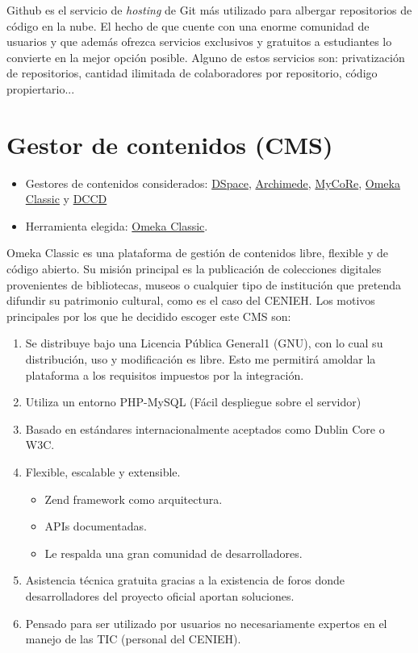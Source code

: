 Github es el servicio de \emph{hosting} de Git más utilizado para albergar repositorios de código en la nube. El hecho de que cuente con una enorme comunidad de usuarios y que además ofrezca servicios exclusivos y gratuitos a estudiantes lo convierte en la mejor opción posible. Alguno de estos servicios son: privatización de repositorios, cantidad ilimitada de colaboradores por repositorio, código propiertario... 

\section{Gestor de contenidos (CMS)}\label{cms}

\begin{itemize}
\tightlist
	\item Gestores de contenidos considerados:
  		\href{https://duraspace.org/dspace/}{DSpace},
  		\href{https://www.bibl.ulaval.ca/archimede/index.en.html}{Archimede},
  		\href{https://www.mycore.de/}{MyCoRe},
  		\href{https://omeka.org/classic/}{Omeka Classic} y
  		\href{https://github.com/DANS-KNAW/dccd-webui}{DCCD}
	\item Herramienta elegida: \href{https://omeka.org/classic/}{Omeka Classic}.
\end{itemize}

Omeka Classic es una plataforma de gestión de contenidos libre, flexible y de código abierto. Su misión principal es la publicación de colecciones digitales provenientes de bibliotecas, museos o cualquier tipo de institución que pretenda difundir su patrimonio cultural, como es el caso del CENIEH. Los motivos principales por los que he decidido escoger este CMS son:
\begin{enumerate}
\tightlist
	\item Se distribuye bajo una Licencia Pública General1 (GNU), con lo cual su distribución, uso y modificación es libre. Esto me permitirá amoldar la plataforma a los requisitos impuestos por la integración.
	\item Utiliza un entorno PHP-MySQL (Fácil despliegue sobre el servidor)
	\item Basado en estándares internacionalmente aceptados como Dublin Core o W3C. 
	\item Flexible, escalable y extensible.
	\begin{itemize}
	\tightlist
		\item Zend framework como arquitectura.
		\item APIs documentadas.
		\item Le respalda una gran comunidad de desarrolladores.
	\end{itemize}
	\item Asistencia técnica gratuita gracias a la existencia de foros donde desarrolladores del proyecto oficial aportan soluciones.
	\item Pensado para ser utilizado por usuarios no necesariamente expertos en el manejo de las TIC (personal del CENIEH).
\end{enumerate}

